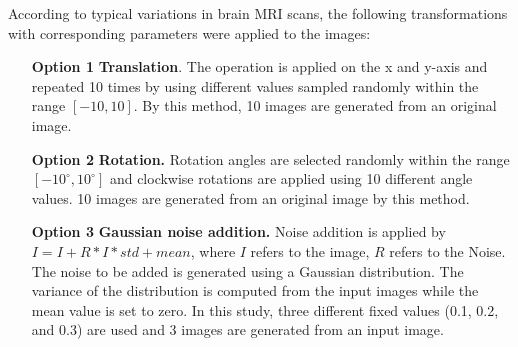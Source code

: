According to typical variations in brain MRI scans, the following transformations with corresponding parameters were applied to the images:
\begin{itemize}
    \item[\textbf{Option 1}] \textbf{Translation}. The operation is applied on the x and y-axis and repeated 10 times by using different values sampled randomly within the range $\left[-10, 10\right]$. By this method, 10 images are generated from an original image.
    \item[\textbf{Option 2}] \textbf{Rotation.} Rotation angles are selected randomly within the range  $\left[-10^{\circ}, 10^{\circ}\right]$ and clockwise rotations are applied using 10 different angle values. 10 images are generated from an original image by this method.
    \item[\textbf{Option 3}] \textbf{Gaussian noise addition.} Noise addition is applied by \mbox{$I=I+R*I*std+mean$}, where $I$ refers to the image, $R$ refers to the Noise. The noise to be added is generated using a Gaussian distribution. The variance of the distribution is computed from the input images while the mean value is set to zero. In this study, three different fixed values (0.1, 0.2, and 0.3) are used and 3 images are generated from an input image.

\end{itemize}
